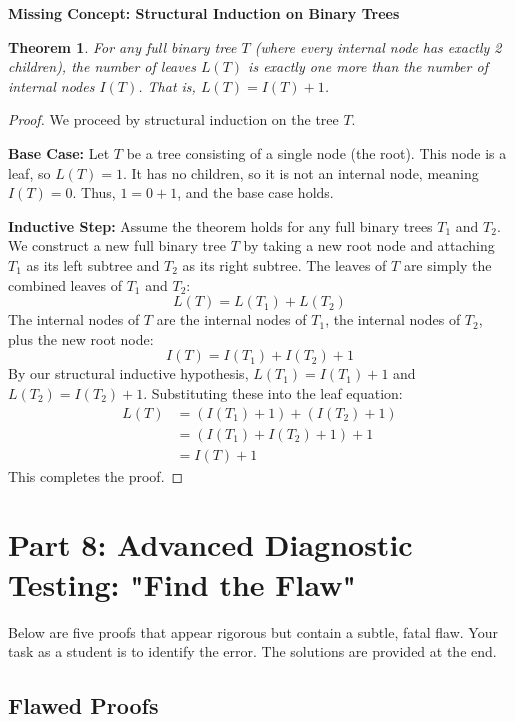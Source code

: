 \documentclass[11pt, a4paper]{article}
\newtheorem{theorem}{Theorem}[section]
\theoremstyle{definition}
\theoremstyle{remark}
\begin{document}
\textbf{Missing Concept: Structural Induction on Binary Trees}
\begin{theorem}
    For any full binary tree $T$ (where every internal node has exactly 2 children), the number of leaves $L(T)$ is exactly one more than the number of internal nodes $I(T)$. That is, $L(T) = I(T) + 1$.
\end{theorem}
\begin{proof}
    We proceed by structural induction on the tree $T$.
    
    \textbf{Base Case:} Let $T$ be a tree consisting of a single node (the root). This node is a leaf, so $L(T) = 1$. It has no children, so it is not an internal node, meaning $I(T) = 0$. Thus, $1 = 0 + 1$, and the base case holds.
    
    \textbf{Inductive Step:} Assume the theorem holds for any full binary trees $T_1$ and $T_2$. We construct a new full binary tree $T$ by taking a new root node and attaching $T_1$ as its left subtree and $T_2$ as its right subtree.
    The leaves of $T$ are simply the combined leaves of $T_1$ and $T_2$:
    \[ L(T) = L(T_1) + L(T_2) \]
    The internal nodes of $T$ are the internal nodes of $T_1$, the internal nodes of $T_2$, plus the new root node:
    \[ I(T) = I(T_1) + I(T_2) + 1 \]
    By our structural inductive hypothesis, $L(T_1) = I(T_1) + 1$ and $L(T_2) = I(T_2) + 1$. Substituting these into the leaf equation:
    \begin{align*}
        L(T) &= (I(T_1) + 1) + (I(T_2) + 1) \\
        &= (I(T_1) + I(T_2) + 1) + 1 \\
        &= I(T) + 1
    \end{align*}
    This completes the proof.
\end{proof}

\section{Part 8: Advanced Diagnostic Testing: "Find the Flaw"}

Below are five proofs that appear rigorous but contain a subtle, fatal flaw. Your task as a student is to identify the error. The solutions are provided at the end.

\subsection{Flawed Proofs}
\end{document}
